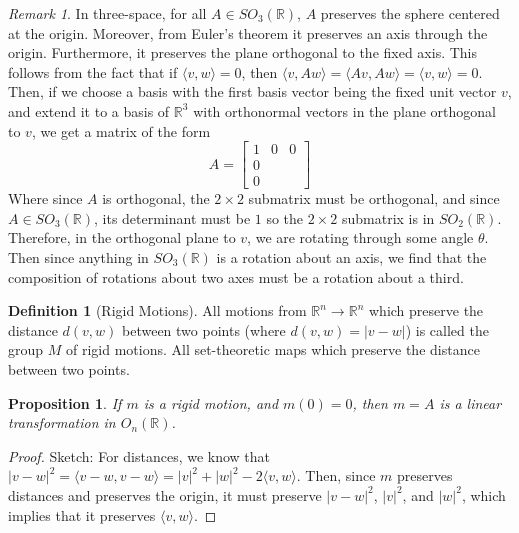 \documentclass[12pt]{article}
\newtheorem{prop}[thm]{Proposition}
\theoremstyle{definition}
\newtheorem{defn}[thm]{Definition}
\theoremstyle{remark}
\newtheorem{rmk}[thm]{Remark}
\numberwithin{equation}{section}
\newcommand\R{\mathbb R}    %
\begin{document}
\begin{rmk}
        In three-space, for all $A \in SO_3(\R)$, $A$ preserves the sphere centered at the origin. Moreover, from Euler's theorem it preserves an axis through the origin. Furthermore, it preserves the plane orthogonal to the fixed axis. This follows from the fact that if $\langle v,w\rangle = 0$, then $\langle v, Aw\rangle = \langle Av, Aw \rangle = \langle v,w \rangle = 0$. Then, if we choose a basis with the first basis vector being the fixed unit vector $v$, and extend it to a basis of $\R^3$ with orthonormal vectors in the plane orthogonal to $v$, we get a matrix of the form \begin{equation}
                A = \left[\begin{array}{c|cc} 1 & 0 & 0 \\ \hline 0 & & \\ 0 & & \end{array}\right]
        \end{equation}
        Where since $A$ is orthogonal, the $2\times 2$ submatrix must be orthogonal, and since $A \in SO_3(\R)$, its determinant must be $1$ so the $2\times 2$ submatrix is in $SO_2(\R)$. Therefore, in the orthogonal plane to $v$, we are rotating through some angle $\theta$. Then since anything in $SO_3(\R)$ is a rotation about an axis, we find that the composition of rotations about two axes must be a rotation about a third.
\end{rmk}

\vspace{15pt}


\begin{defn}[Rigid Motions]
        All motions from $\R^n\rightarrow \R^n$ which preserve the distance $d(v,w)$ between two points (where $d(v,w) = |v-w|$) is called the group $M$ of rigid motions. All set-theoretic maps which preserve the distance between two points.  
\end{defn}

\vspace{15pt}

\begin{prop}
        If $m$ is a rigid motion, and $m(0) = 0$, then $m = A$ is a linear transformation in $O_n(\R)$.
\end{prop}
\begin{proof}
        Sketch: For distances, we know that $|v-w|^2 = \langle v - w, v - w\rangle = |v|^2 + |w|^2 - 2 \langle v,w\rangle$. Then, since $m$ preserves distances and preserves the origin, it must preserve $|v-w|^2$, $|v|^2$, and $|w|^2$, which implies that it preserves $\langle v,w\rangle$.
\end{proof}
\end{document}
